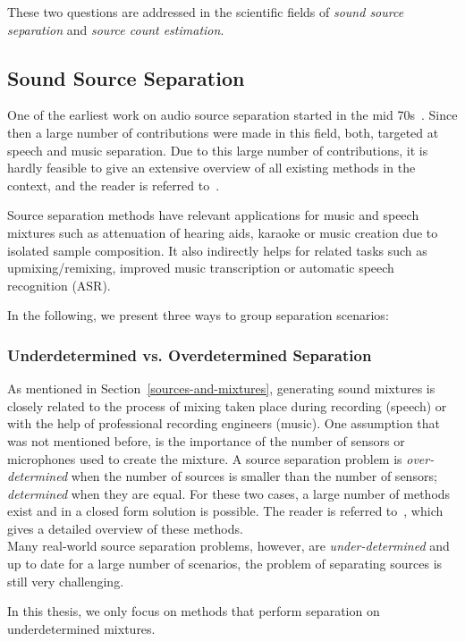 These two questions are addressed in the scientific fields of \emph{sound source separation} and \emph{source count estimation}.

\subsection{Sound Source Separation}

One of the earliest work on audio source separation started in the mid 70s~\cite{miller73}.
Since then a large number of contributions were made in this field, both, targeted at speech and music separation.
Due to this large number of contributions, it is hardly feasible to give an extensive overview of all existing methods in the context, and the reader is referred to~\cite{vincent18, comon10, rafii}.
\par
Source separation methods have relevant applications for music and speech mixtures such as attenuation of hearing aids, karaoke or music creation due to isolated sample composition.
It also indirectly helps for related tasks such as upmixing/remixing, improved music transcription or automatic speech recognition (ASR). 
\par
In the following, we present three ways to group separation scenarios:

\subsubsection*{Underdetermined vs. Overdetermined Separation}
As mentioned in Section~\ref{sources-and-mixtures}, generating sound mixtures is closely related to the process of mixing taken place during recording (speech) or with the help of professional recording engineers (music).
One assumption that was not mentioned before, is the importance of the number of sensors or microphones used to create the mixture.
A source separation problem is \emph{over-determined} when the number of sources is smaller than the number of sensors; \emph{determined} when they are equal.
For these two cases, a large number of methods exist and in a closed form solution is possible.
The reader is referred to~\cite{common10}, which gives a detailed overview of these methods.\\
Many real-world source separation problems, however, are \emph{under-determined} and up to date for a large number of scenarios, the problem of separating sources is still very challenging.
\par
In this thesis, we only focus on methods that perform separation on underdetermined mixtures.

